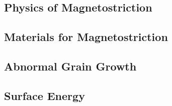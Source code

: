 \subsection{Physics of Magnetostriction}


\subsection{Materials for Magnetostriction}\label{magnetostrict-materials}


\subsection{Abnormal Grain Growth}\label{abnormal-grain-growth}



\subsection{Surface Energy}\label{surface-energy}


